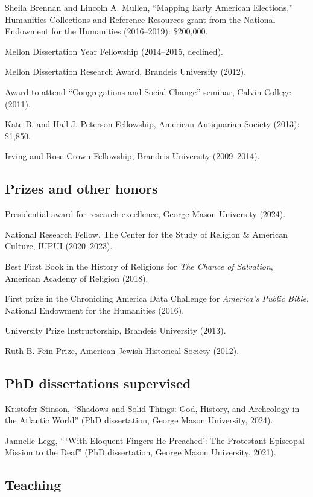 \documentclass[11pt]{article}
\begin{document}
Sheila Brennan and Lincoln A. Mullen, ``Mapping Early American Elections,'' Humanities Collections and Reference Resources grant from the National Endowment for the Humanities (2016--2019): \$200,000. 

Mellon Dissertation Year Fellowship (2014--2015, declined).

Mellon Dissertation Research Award, Brandeis University (2012).

Award to attend ``Congregations and Social Change'' seminar, Calvin College (2011).

Kate B. and Hall J. Peterson Fellowship, American Antiquarian Society (2013): \$1,850.

Irving and Rose Crown Fellowship, Brandeis University (2009--2014).

\subsection{Prizes and other honors}\label{Prizes}

Presidential award for research excellence, George Mason University (2024).

National Research Fellow, The Center for the Study of Religion \& American 
Culture, IUPUI (2020--2023).

Best First Book in the History of Religions for \emph{The Chance of Salvation}, American Academy of Religion (2018).

First prize in the Chronicling America Data Challenge for \emph{America's Public Bible}, National Endowment for the Humanities (2016).

University Prize Instructorship, Brandeis University (2013).

Ruth B. Fein Prize, American Jewish Historical Society (2012). 

\subsection{PhD dissertations supervised}\label{Dissertations supervised}

Kristofer Stinson, ``Shadows and Solid Things: God, History, and Archeology in 
the Atlantic World'' (PhD dissertation, George Mason University, 2024).

Jannelle Legg, ``\,`With Eloquent Fingers He Preached': The Protestant Episcopal Mission to the Deaf'' (PhD dissertation, George Mason University, 2021).

\subsection{Teaching}\label{Teaching}
\end{document}
